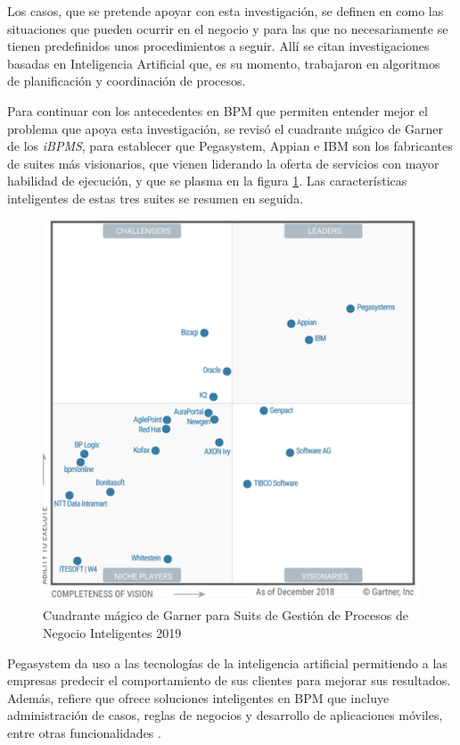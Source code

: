 Los casos, que se pretende apoyar con esta investigación, se definen en \citet{van2005case} como las situaciones que pueden ocurrir en el negocio y para las que no necesariamente se tienen predefinidos unos procedimientos a seguir. Allí se citan investigaciones basadas en Inteligencia Artificial que, es su momento, trabajaron en algoritmos de planificación y coordinación de procesos.

Para continuar con los antecedentes en BPM que permiten entender mejor el problema que apoya esta investigación, se revisó el cuadrante mágico de Garner de los \textit{iBPMS}, para establecer que Pegasystem, Appian e IBM son los fabricantes de suites más visionarios, que vienen liderando la oferta de servicios con mayor habilidad de ejecución, y que se plasma en la figura \ref{garner}. Las características inteligentes de estas tres suites se resumen en seguida.

\begin{figure}[htp]
	\centering
		\includegraphics[scale=0.7]{Cuadrante magico 2018.png}
	\caption[Garner iBPMS 2019 ]{Cuadrante mágico de Garner para Suits de Gestión de Procesos de Negocio Inteligentes 2019}
	\label{garner}
\end{figure}

Pegasystem da uso a las tecnologías de la inteligencia artificial permitiendo a las empresas predecir el comportamiento de sus clientes para mejorar sus resultados. Además, refiere que ofrece soluciones inteligentes en BPM que incluye administración de casos, reglas de negocios y desarrollo de aplicaciones móviles, entre otras funcionalidades \citep{Pega2013}.

